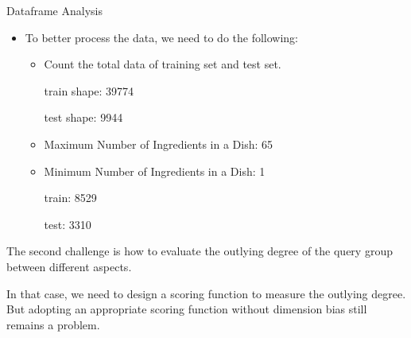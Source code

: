 \documentclass[
 size=14pt,
 paper=smartboard,  %
 mode=present, 		%
 display=slides, 	%
 style=tuliplab,  	%
 pauseslide,
 fleqn,leqno]{powerdot}
\begin{document}
\begin{slide}[toc=,bm=]{Dataframe Analysis}

  \begin{itemize}
  \item
  To better process the data, we need to do the following:
  
  \begin{itemize}
  \item
  Count the total data of training set and test set.
  
  train shape: 39774
  
  test shape: 9944
  \item
  Maximum Number of Ingredients in a Dish:  65
  \item
  Minimum Number of Ingredients in a Dish:  1
  
  train: 8529 
  
  test: 3310
 
  \end{itemize}
  \end{itemize}
  
  \begin{note}
  The second challenge is how to evaluate the outlying degree of
  the query group between different aspects.
  
  In that case,
  we need to design a scoring function to measure the outlying degree.
  But adopting an appropriate scoring function without dimension bias still remains a problem.
  \end{note}
  
  \end{slide}
\end{document}
